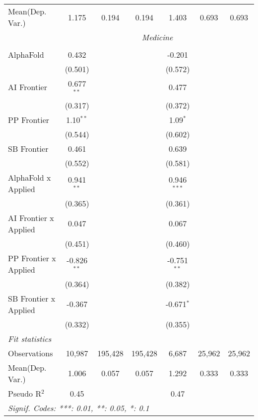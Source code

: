 \begin{tabular}{lcccccc}
Mean(Dep. Var.) & 1.175 & 0.194 & 0.194 & 1.403 & 0.693 & 0.693 \\
 & \multicolumn{6}{c}{\textit{Medicine}} \\ \\
   AlphaFold             & 0.432         &         &         & -0.201        &        &   \\   
                         & (0.501)       &         &         & (0.572)       &        &   \\   
   AI Frontier           & 0.677$^{**}$  &         &         & 0.477         &        &   \\   
                         & (0.317)       &         &         & (0.372)       &        &   \\   
   PP Frontier           & 1.10$^{**}$   &         &         & 1.09$^{*}$    &        &   \\   
                         & (0.544)       &         &         & (0.602)       &        &   \\   
   SB Frontier           & 0.461         &         &         & 0.639         &        &   \\   
                         & (0.552)       &         &         & (0.581)       &        &   \\   
   AlphaFold x Applied   & 0.941$^{**}$  &         &         & 0.946$^{***}$ &        &   \\   
                         & (0.365)       &         &         & (0.361)       &        &   \\   
   AI Frontier x Applied & 0.047         &         &         & 0.067         &        &   \\   
                         & (0.451)       &         &         & (0.460)       &        &   \\   
   PP Frontier x Applied & -0.826$^{**}$ &         &         & -0.751$^{**}$ &        &   \\   
                         & (0.364)       &         &         & (0.382)       &        &   \\   
   SB Frontier x Applied & -0.367        &         &         & -0.671$^{*}$  &        &   \\   
                         & (0.332)       &         &         & (0.355)       &        &   \\   
   \midrule
   \emph{Fit statistics}\\
   Observations          & 10,987        & 195,428 & 195,428 & 6,687         & 25,962 & 25,962\\  
Mean(Dep. Var.) & 1.006 & 0.057 & 0.057 & 1.292 & 0.333 & 0.333 \\
   Pseudo R$^2$          & 0.45          &         &         & 0.47          &        & \\  
   \midrule \midrule
   \multicolumn{7}{l}{\emph{Signif. Codes: ***: 0.01, **: 0.05, *: 0.1}}\\
\end{tabular}
\par\endgroup
